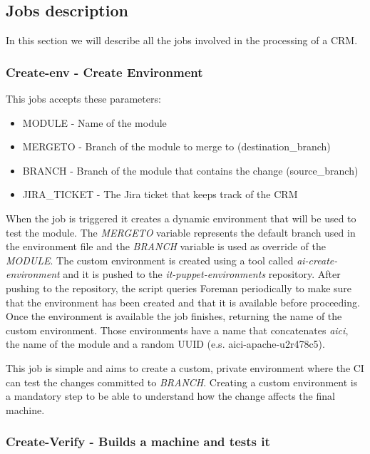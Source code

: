 \subsection{Jobs description}

In this section we will describe all the jobs involved in the processing of
a CRM.

\subsubsection{Create-env - Create Environment}

This jobs accepts these parameters:

\begin{itemize}
  \item MODULE - Name of the module
  \item MERGETO - Branch of the module to merge to (destination\_branch)
  \item BRANCH - Branch of the module that contains the change (source\_branch)
  \item JIRA\_TICKET - The Jira ticket that keeps track of the CRM
\end{itemize}

When the job is triggered it creates a dynamic environment that will be
used to test the module. The \textit{MERGETO} variable represents the
default branch used in the environment file and the \textit{BRANCH}
variable is used as override of the \textit{MODULE}. The custom
environment is created using a tool called \textit{ai-create-environment}
and it is pushed to the \textit{it-puppet-environments} repository. After
pushing to the repository, the script queries Foreman periodically to make
sure that the environment has been created and that it is available before
proceeding. Once the environment is available the job finishes, returning
the name of the custom environment. Those environments have a name that
concatenates \textit{aici}, the name of the module and a random UUID (e.s.
aici-apache-u2r478c5).

This job is simple and aims to create a custom, private environment where
the CI can test the changes committed to \textit{BRANCH}. Creating
a custom environment is a mandatory step to be able to understand how the
change affects the final machine.

\subsubsection{Create-Verify - Builds a machine and tests it}

